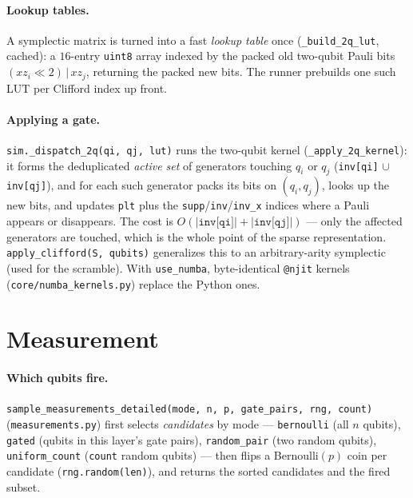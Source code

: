 \documentclass[11pt]{article}
\newcommand{\code}[1]{\texttt{#1}}
\newcommand{\file}[1]{\texttt{#1}}
\begin{document}
\paragraph{Lookup tables.} A symplectic matrix is turned into a fast \emph{lookup table} once
(\code{\_build\_2q\_lut}, cached): a $16$-entry \code{uint8} array indexed by the packed old two-qubit Pauli bits
$(\mathit{xz}_i{\ll}2)\,|\,\mathit{xz}_j$, returning the packed new bits. The runner prebuilds one such LUT per
Clifford index up front.

\paragraph{Applying a gate.} \code{sim.\_dispatch\_2q(qi, qj, lut)} runs the two-qubit kernel
(\code{\_apply\_2q\_kernel}): it forms the deduplicated \emph{active set} of generators touching $q_i$ or $q_j$
(\code{inv[qi]} $\cup$ \code{inv[qj]}), and for each such generator packs its bits on $(q_i,q_j)$, looks up the
new bits, and updates \code{plt} plus the \code{supp}/\code{inv}/\code{inv\_x} indices where a Pauli appears or
disappears. The cost is $O(|\code{inv[qi]}|+|\code{inv[qj]}|)$ --- only the affected generators are touched, which
is the whole point of the sparse representation. \code{apply\_clifford(S, qubits)} generalizes this to an
arbitrary-arity symplectic (used for the scramble). With \code{use\_numba}, byte-identical \code{@njit} kernels
(\file{core/numba\_kernels.py}) replace the Python ones.

\section{Measurement}
\label{sec:measure}
\paragraph{Which qubits fire.} \code{sample\_measurements\_detailed(mode, n, p, gate\_pairs, rng, count)}
(\file{measurements.py}) first selects \emph{candidates} by mode --- \code{bernoulli} (all $n$ qubits),
\code{gated} (qubits in this layer's gate pairs), \code{random\_pair} (two random qubits), \code{uniform\_count}
(\code{count} random qubits) --- then flips a Bernoulli$(p)$ coin per candidate (\code{rng.random(len)}), and
returns the sorted candidates and the fired subset.
\end{document}
